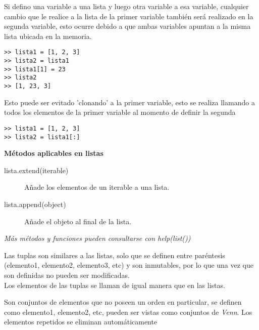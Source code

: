 \documentclass[10pt,a4paper]{article}
\begin{document}
\begin{description}[
align=right,
labelindent = 1cm,
labelsep=0.5cm,
itemindent=0cm]
		Si defino una variable a una lista y luego otra variable a esa variable, cualquier cambio que le realice a la lista de la primer variable también será realizado en la segunda variable, esto ocurre debido a que ambas variables apuntan a la misma lista ubicada en la memoria.\\
\begin{lstlisting}
>> lista1 = [1, 2, 3]
>> lista2 = lista1
>> lista1[1] = 23
>> lista2
>> [1, 23, 3]\end{lstlisting}
	Esto puede ser evitado 'clonando' a la primer variable, esto se realiza llamando a todos los elementos de la primer variable al momento de definir la segunda\\
\begin{lstlisting}
>> lista1 = [1, 2, 3]
>> lista2 = lista1[:]\end{lstlisting}
\textbf{Métodos aplicables en listas}
\begin{description}
	    \item [lista.extend(iterable)] Añade los elementos de un iterable a una lista.
            \item [lista.append(object)] Añade el objeto al final de la lista.
        \end{description}
        \textit{Más métodos y funciones pueden consultarse con \emph{help(list())}}
        
    \item [tuple]
        Las tuplas son similares a las listas, solo que se definen entre paréntesis (elemento1, elemento2, elemento3, etc) y son inmutables, por lo que una vez que son definidas no pueden ser modificadas.\\ Los elementos de las tuplas se llaman de igual manera que en las listas.
    
    \item [set]
        Son conjuntos de elementos que no poseen un orden en particular, se definen como {elemento1, elemento2, etc}, pueden ser vistas como conjuntos de \emph{Venn}. Los elementos repetidos se eliminan automáticamente\\
        

\end{description}
\end{document}
